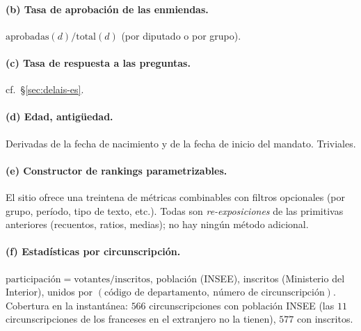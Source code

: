 \paragraph{(b) Tasa de aprobación de las enmiendas.} $\mathrm{aprobadas}(d)/\mathrm{total}(d)$
(por diputado o por grupo).

\paragraph{(c) Tasa de respuesta a las preguntas.} cf.~§\ref{sec:delais-es}.

\paragraph{(d) Edad, antigüedad.} Derivadas de la fecha de nacimiento y de la fecha
de inicio del mandato. Triviales.

\paragraph{(e) Constructor de rankings parametrizables.} El sitio ofrece una
treintena de \og{}métricas\fg{} combinables con filtros opcionales (por grupo,
período, tipo de texto, etc.). Todas son \emph{re-exposiciones} de las primitivas
anteriores (recuentos, ratios, medias); no hay ningún método adicional.

\paragraph{(f) Estadísticas por circunscripción.} $\mathrm{participación}=\mathrm{votantes}/\mathrm{inscritos}$,
población (INSEE), inscritos (Ministerio del Interior), unidos por
$(\text{código de departamento},\ \text{número de circunscripción})$. Cobertura en
la instantánea: $566$ circunscripciones con población INSEE (las $11$
circunscripciones de los franceses en el extranjero no la tienen), $577$ con
inscritos.


